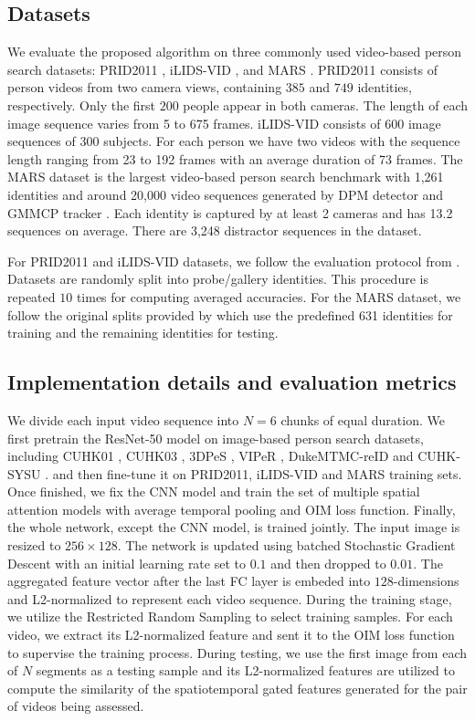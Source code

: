 \subsection{Datasets}
We evaluate the proposed algorithm on three commonly used video-based person search datasets: PRID2011 \cite{hirzer2011person}, iLIDS-VID \cite{wang2014person}, and MARS \cite{zheng2016mars}.
PRID2011 consists of person videos from two camera views, containing $385$ and $749$ identities, respectively. Only the first $200$ people appear in both cameras. The length of each image sequence varies from 5 to 675 frames. 
iLIDS-VID consists of 600 image sequences of 300 subjects. 
For each person we have two videos with the sequence length ranging from 23 to 192 frames with an average duration of 73 frames. 
The MARS dataset is the largest video-based person search benchmark with 1,261 identities and around 20,000 video sequences generated by DPM detector \cite{felzenszwalb2010object} and GMMCP tracker \cite{dehghan2015gmmcp}. Each identity is captured by at least 2 cameras and has 13.2 sequences on average. There are 3,248 distractor sequences in the dataset. 

For PRID2011 and iLIDS-VID datasets, we follow the evaluation protocol from \cite{wang2014person}.
Datasets are randomly split into probe/gallery identities. 
This procedure is repeated $10$ times for computing averaged accuracies.
For the MARS dataset, we follow the original splits provided by \cite{zheng2016mars} which use the predefined 631 identities for training and the remaining identities for testing.

\subsection{Implementation details and evaluation metrics}

We divide each input video sequence into $N=6$ chunks of equal duration. 
We first pretrain the ResNet-50 model on image-based person search datasets, including CUHK01 \cite{li2013locally}, CUHK03 \cite{li2014deepreid}, 3DPeS \cite{baltieri20113dpes}, VIPeR \cite{gray2007evaluating}, DukeMTMC-reID \cite{zheng2017unlabeled} and CUHK-SYSU \cite{xiao2017joint}.
and then fine-tune it on PRID2011, iLIDS-VID and MARS training sets. 
Once finished, we fix the CNN model and train the set of multiple spatial attention models with average temporal pooling and OIM loss function. 
Finally, the whole network, except the CNN model, is trained jointly. 
The input image is resized to $256 \times 128$. 
The network is updated using batched Stochastic Gradient Descent with an initial learning rate set to $0.1$ and then dropped to $0.01$. The aggregated feature vector after the last FC layer is embeded into $128$-dimensions and L2-normalized to represent each video sequence. During the training stage, we utilize the Restricted Random Sampling to select training samples. For each video, we extract its L2-normalized feature and sent it to the OIM loss function to supervise the training process.
During testing, we use the first image from each of $N$ segments as a testing sample and its L2-normalized features are utilized to compute the similarity of the spatiotemporal gated features generated for the pair of videos being assessed.

